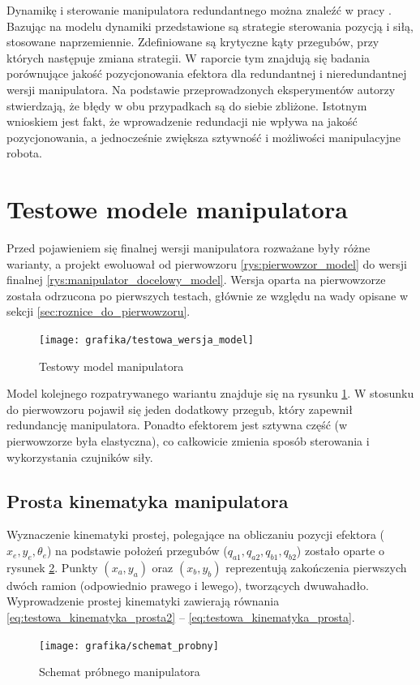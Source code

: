 \documentclass[printmode]{mgr}
\begin{document}
Dynamikę i sterowanie manipulatora redundantnego można znaleźć w pracy \cite{inne4}. Bazując na modelu dynamiki przedstawione
są strategie sterowania pozycją i siłą, stosowane naprzemiennie. Zdefiniowane są krytyczne kąty przegubów, przy których następuje zmiana
strategii. W raporcie tym znajdują się badania porównujące jakość pozycjonowania efektora dla redundantnej i nieredundantnej wersji manipulatora.
Na podstawie przeprowadzonych eksperymentów autorzy stwierdzają, że błędy w obu przypadkach są do siebie zbliżone. Istotnym wnioskiem jest
fakt, że wprowadzenie redundacji nie wpływa na jakość pozycjonowania, a jednocześnie zwiększa sztywność i możliwości manipulacyjne robota.

\section{Testowe modele manipulatora}
Przed pojawieniem się finalnej wersji manipulatora rozważane były różne warianty, a projekt ewoluował od pierwowzoru \ref{rys:pierwowzor_model}
do wersji finalnej \ref{rys:manipulator_docelowy_model}. Wersja oparta na pierwowzorze została odrzucona po pierwszych
testach, głównie ze względu na wady opisane w sekcji \ref{sec:roznice_do_pierwowzoru}. 
\begin{figure}[tp]
\centering
  \texttt{[image: grafika/testowa\_wersja\_model]}
  \caption{Testowy model manipulatora}
  \label{rys:testowa_wersja_model}  
\end{figure}

Model kolejnego rozpatrywanego wariantu znajduje się na rysunku \ref{rys:testowa_wersja_model}. W stosunku do pierwowzoru pojawił
się jeden dodatkowy przegub, który zapewnił redundancję manipulatora. Ponadto efektorem jest sztywna część (w pierwowzorze była elastyczna),
co całkowicie zmienia sposób sterowania i wykorzystania czujników siły. 

\subsection{Prosta kinematyka manipulatora}
Wyznaczenie kinematyki prostej, polegające
na obliczaniu pozycji efektora ($x_e, y_e, \theta_e$) na podstawie położeń przegubów ($q_{a1}, q_{a2}, q_{b1}, q_{b2}$)
zostało oparte o rysunek \ref{rys:schemat_probny}. Punkty $(x_a, y_a)$ oraz $(x_b, y_b)$ reprezentują zakończenia pierwszych
dwóch ramion (odpowiednio prawego i lewego), tworzących dwuwahadło. Wyprowadzenie prostej kinematyki zawierają równania 
\ref{eq:testowa_kinematyka_prosta2} -- \ref{eq:testowa_kinematyka_prosta}.
\begin{figure}[tp]
\centering
  \texttt{[image: grafika/schemat\_probny]}
  \caption{Schemat próbnego manipulatora}
  \label{rys:schemat_probny}  
\end{figure}
\end{document}
